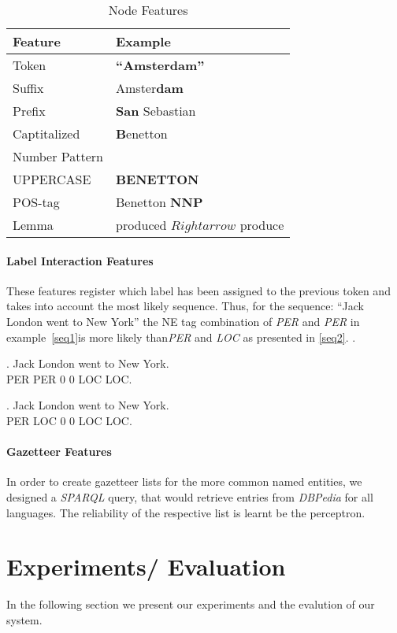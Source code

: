 \documentclass[11pt]{article}
\begin{document}
\begin{table}[h!]
\begin{tabular}{l|l}
\hline
\bf Feature & \bf Example \\
\hline
Token &  \textbf{``Amsterdam''}\\
Suffix& Amster\textbf{dam}\\
Prefix&  \textbf{San} Sebastian\\
Captitalized& \textbf{B}enetton\\
Number Pattern & \\
UPPERCASE &  \textbf{BENETTON}\\
POS-tag &  Benetton \textbf{NNP}   \\
Lemma &  produced $Rightarrow$ produce \\
\end{tabular}
\caption{Node Features}
\label{table:node}
\end{table}

\paragraph*{Label Interaction Features}
These features register which label has been assigned to the previous token and takes into account the most likely sequence. 
Thus, for the sequence: ``Jack London went to New York'' the NE tag combination of \emph{PER} and \emph{PER} in example~\ref{seq1}is more likely 
than\emph{PER} and \emph{LOC} as presented in \ref{seq2}.
.

\ex. Jack London went to New York. \\ PER   PER  0  0  LOC   LOC. \label{seq1}

\ex. Jack London went to New York. \\ PER   LOC  0  0  LOC   LOC. \label{seq2}
    

\paragraph*{Gazetteer Features}
In order to create gazetteer lists for the more common named entities, we designed a \emph{SPARQL} query, that would retrieve entries from \emph{DBPedia} for all
languages. The reliability of the respective list is learnt be the perceptron. 


\section{Experiments/ Evaluation}
In the following section we present our experiments and the evalution of our system.
\end{document}
